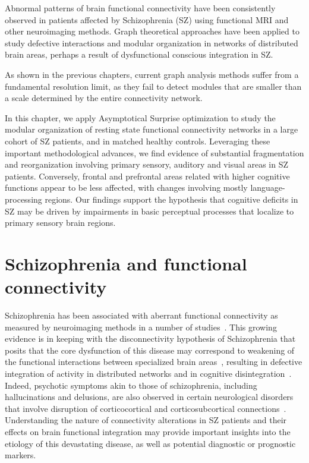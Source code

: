 Abnormal patterns of brain functional connectivity have been consistently observed in patients affected by Schizophrenia (SZ) using functional MRI and other neuroimaging methods.
Graph theoretical approaches have been applied to study defective interactions and modular organization in networks of distributed brain areas, perhaps a result of dysfunctional conscious integration in SZ.

As shown in the previous chapters, current graph analysis methods suffer from a fundamental resolution limit, as they fail to detect modules that are smaller than a scale determined by the entire connectivity network.

In this chapter, we apply Asymptotical Surprise optimization to study the modular organization of resting state functional connectivity networks in a large cohort of SZ patients, and in matched healthy controls.
Leveraging these important methodological advances, we find evidence of substantial fragmentation and reorganization involving primary sensory, auditory and visual areas in SZ patients.
Conversely, frontal and prefrontal areas related with higher cognitive functions appear to be less affected, with changes involving mostly language-processing regions.
Our findings support the hypothesis that cognitive deficits in SZ may be driven by impairments in basic perceptual processes that localize to primary sensory brain regions.

\section{Schizophrenia and functional connectivity}
Schizophrenia has been associated with aberrant functional connectivity as measured by neuroimaging methods in a number of studies~\cite{friston1995,bullmore1998,liang2006,liu2008,calhoun2009}.
This growing evidence is in keeping with the disconnectivity hypothesis of Schizophrenia that posits that the core dysfunction of this disease may correspond to weakening of the functional interactions between specialized brain areas~\cite{ellison-wright2009,fornito2009,kubicki2005}, resulting in defective integration of activity in distributed networks and in cognitive disintegration~\cite{tononi2000}.
Indeed, psychotic symptoms akin to those of schizophrenia, including hallucinations and delusions, are also observed in certain neurological disorders that involve disruption of corticocortical and corticosubcortical connections~\cite{hyde1992}.
Understanding the nature of connectivity alterations in SZ patients and their effects on brain functional integration may provide important insights into the etiology of this devastating disease, as well as potential diagnostic or prognostic markers.

